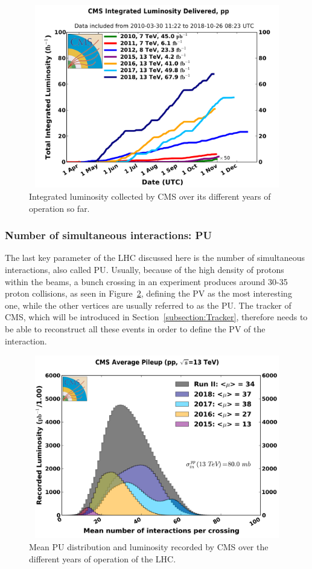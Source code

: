\documentclass[a4paper, 10pt, openright]{report}
\begin{document}
\begin{figure}[htbp]
\begin{center}
\includegraphics[width=12cm, height=8cm]{figs/CumuLumi.pdf}
\caption{Integrated luminosity collected by \ac{CMS} over its different years of operation so far.}
\label{fig:Lumi}
\end{center}
\end{figure}

\subsubsection{Number of simultaneous interactions: \acf{PU}} \label{subsection:PU}

The last key parameter of the \ac{LHC} discussed here is the number of simultaneous interactions, also called \ac{PU}. Usually, because of the high density of protons within the beams, a bunch crossing in an experiment produces around 30-35 proton collisions, as seen in Figure~\ref{fig:PU}, defining the \ac{PV} as the most interesting one, while the other vertices are usually referred to as the \ac{PU}. The tracker of \ac{CMS}, which will be introduced in Section~\ref{subsection:Tracker}, therefore needs to be able to reconstruct all these events in order to define the \ac{PV} of the interaction. 

\begin{figure}[htbp]
\begin{center}
\includegraphics[width=12cm, height=8cm]{figs/PUSummary.png}
\caption{Mean \ac{PU} distribution and luminosity recorded by \ac{CMS} over the different years of operation of the \ac{LHC}.}
\label{fig:PU}
\end{center}
\end{figure}
\end{document}
